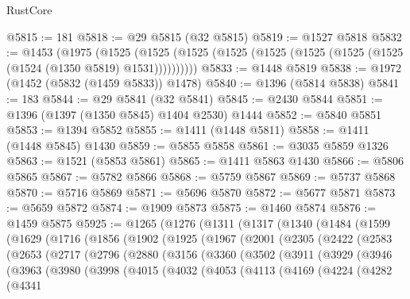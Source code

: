 \begin{lexlean}{RustCore}
\begin{coremodule}
{\begin{coremodule}
{{{{{{{{{{{{{{{{{{{{{{{{{{{{{{{{{{{{{{{{{{{{{@5815 := 181
@5818 := @29 @5815 (@32 @5815)
@5819 := @1527 @5818
@5832 := @1453
    (@1975
      (@1525 (@1525 (@1525 (@1525 (@1525 (@1525 (@1525 (@1525 (@1524 (@1350 @5819) @1531))))))))))
@5833 := @1448 @5819
@5838 := @1972 (@1452 (@5832 (@1459 @5833)) @1478)
@5840 := @1396 (@5814 @5838)
@5841 := 183
@5844 := @29 @5841 (@32 @5841)
@5845 := @2430 @5844
@5851 := @1396 (@1397 (@1350 @5845) @1404 @2530) @1444
@5852 := @5840 @5851
@5853 := @1394 @5852
@5855 := @1411 (@1448 @5811)
@5858 := @1411 (@1448 @5845) @1430
@5859 := @5855 @5858
@5861 := @3035 @5859 @1326
@5863 := @1521 (@5853 @5861)
@5865 := @1411 @5863 @1430
@5866 := @5806 @5865
@5867 := @5782 @5866
@5868 := @5759 @5867
@5869 := @5737 @5868
@5870 := @5716 @5869
@5871 := @5696 @5870
@5872 := @5677 @5871
@5873 := @5659 @5872
@5874 := @1909 @5873
@5875 := @1460 @5874
@5876 := @1459 @5875
@5925 := @1265
    (@1276
      (@1311
        (@1317
          (@1340
            (@1484
              (@1599
                (@1629
                  (@1716
                    (@1856
                      (@1902
                        (@1925
                          (@1967
                            (@2001
                              (@2305
                                (@2422
                                  (@2583
                                    (@2653
                                      (@2717
                                        (@2796
                                          (@2880
                                            (@3156
                                              (@3360
                                                (@3502
                                                  (@3911
                                                    (@3929
                                                      (@3946
                                                        (@3963
                                                          (@3980
                                                            (@3998
                                                              (@4015
                                                                (@4032
                                                                  (@4053
                                                                    (@4113
                                                                      (@4169
                                                                        (@4224
                                                                          (@4282
                                                                            (@4341
}}}}}}}}}}}}}}}}}}}}}}}}}}}}}}}}}}}}}}}}}}}}}
\end{coremodule}}
\end{coremodule}
\end{lexlean}
